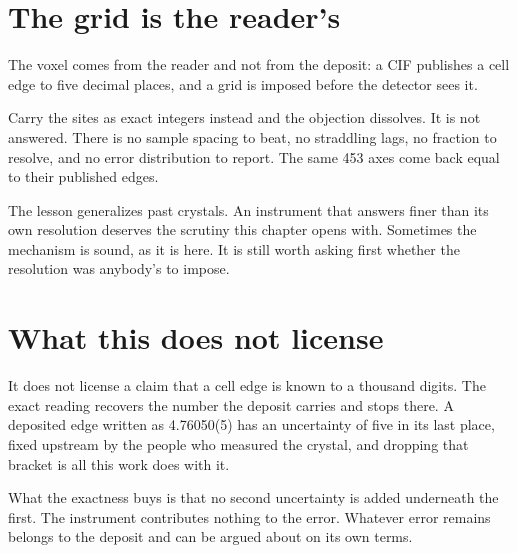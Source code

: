 \section{The grid is the reader's}

The voxel comes from the reader and not from the deposit: a CIF publishes a cell edge to five decimal places, and a grid is imposed before the detector sees it.

Carry the sites as exact integers instead and the objection dissolves. It is not answered. There is no sample spacing to beat, no straddling lags, no fraction to resolve, and no error distribution to report. The same 453 axes come back equal to their published edges.

The lesson generalizes past crystals. An instrument that answers finer than its own resolution deserves the scrutiny this chapter opens with. Sometimes the mechanism is sound, as it is here. It is still worth asking first whether the resolution was anybody's to impose.

\section{What this does not license}

It does not license a claim that a cell edge is known to a thousand digits. The exact reading recovers the number the deposit carries and stops there. A deposited edge written as 4.76050(5) has an uncertainty of five in its last place, fixed upstream by the people who measured the crystal, and dropping that bracket is all this work does with it.

What the exactness buys is that no second uncertainty is added underneath the first. The instrument contributes nothing to the error. Whatever error remains belongs to the deposit and can be argued about on its own terms.
